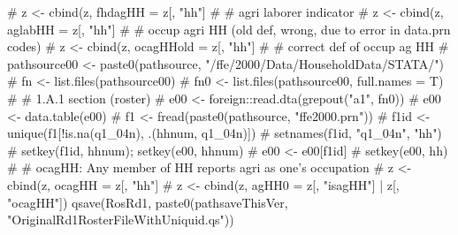 \begin{Schunk}
\begin{Sinput}
# 	z <- cbind(z, fhdagHH = z[, "hh"] %in% z[(ii1|ii2|ii3) & y2k & hd & fem, "hh"])
# 		#	agri laborer indicator
# 	z <- cbind(z, aglabHH = z[, "hh"] %in% z[iiL & y2k, "hh"])
# 		#	occup agri HH (old def, wrong, due to error in data.prn codes)
# 	z <- cbind(z, ocagHHold = z[, "hh"] %in% z[ii2 & y2k, "hh"])
# 		# correct def of occup ag HH
# 	pathsource00 <- paste0(pathsource, "/ffe/2000/Data/HouseholdData/STATA/")
# 	fn <- list.files(pathsource00)
# 	fn0 <- list.files(pathsource00, full.names = T)
# 	# 1.A.1 section (roster)
# 	e00 <- foreign::read.dta(grepout("a1", fn0))
# 	e00 <- data.table(e00)
# 	f1 <- fread(paste0(pathsource, "ffe2000.prn"))
# 	f1id <- unique(f1[!is.na(q1_04n), .(hhnum, q1_04n)])
# 	setnames(f1id, "q1_04n", "hh")
# 	setkey(f1id, hhnum); setkey(e00, hhnum)
# 	e00 <- e00[f1id]
# 	setkey(e00, hh)
# 	# ocagHH: Any member of HH reports agri as one's occupation
# 	z <- cbind(z, ocagHH = z[, "hh"] %in% unique(e00[grepl("Ag|arm|enan", occup), hh]))
#	z <- cbind(z, agHH0 = z[, "isagHH"] | z[, "ocagHH"])
qsave(RosRd1, paste0(pathsaveThisVer, "OriginalRd1RosterFileWithUniquid.qs"))
\end{Sinput}
\end{Schunk}

